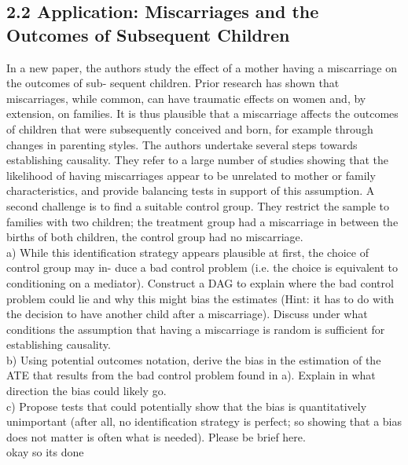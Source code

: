 \documentclass[a4paper,12pt,oneside,English]{article}
\begin{document}
\subsection{2.2 
Application: Miscarriages and the Outcomes of Subsequent Children}
In a new paper, the authors study the effect of a mother having a miscarriage on the outcomes of sub- sequent children. Prior research has shown that miscarriages, while common, can have traumatic effects on women and, by extension, on families. It is thus plausible that a miscarriage affects the outcomes of children that were subsequently conceived and born, for example through changes in parenting styles.
The authors undertake several steps towards establishing causality. They refer to a large number of studies showing that the likelihood of having miscarriages appear to be unrelated to mother or family characteristics, and provide balancing tests in support of this assumption. A second challenge is to find a suitable control group. They restrict the sample to families with two children; the treatment group had a miscarriage in between the births of both children, the control group had no miscarriage.\\

a) While this identification strategy appears plausible at first, the choice of control group may in- duce a bad control problem (i.e. the choice is equivalent to conditioning on a mediator). Construct a DAG to explain where the bad control problem could lie and why this might bias the estimates (Hint: it has to do with the decision to have another child after a miscarriage). Discuss under what conditions the assumption that having a miscarriage is random is sufficient for establishing causality.\\
b) Using potential outcomes notation, derive the bias in the estimation of the ATE that results from the bad control problem found in a). Explain in what direction the bias could likely go.\\
c) Propose tests that could potentially show that the bias is quantitatively unimportant (after all, no identification strategy is perfect; so showing that a bias does not matter is often what is needed). Please be brief here.\\


okay so its done
\end{document}
